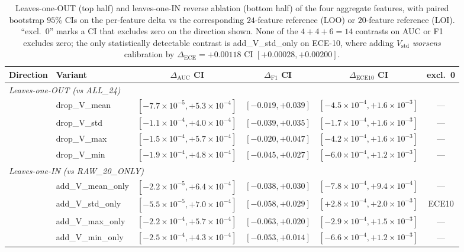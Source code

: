 \documentclass{article}
\begin{document}
\begin{table}[t]
\centering
\small
\caption{Leaves-one-OUT (top half) and leaves-one-IN reverse
ablation (bottom half) of the four aggregate features, with paired
bootstrap $95$\% CIs on the per-feature delta vs the
corresponding $24$-feature reference (LOO) or $20$-feature reference
(LOI). ``excl.\ 0'' marks a CI that excludes zero on the direction
shown. None of the $4{+}4{+}6{=}14$ contrasts on AUC or F1
excludes zero; the only statistically detectable contrast is
\textsf{add\_V\_std\_only} on ECE-10, where adding $V_{\text{std}}$
\emph{worsens} calibration by $\Delta_{\text{ECE}}{=}{+}0.00118$
CI $[{+}0.00028, {+}0.00200]$.}
\label{tab:p8-perfeat-abl}
\begin{tabular}{llcccc}
\toprule
Direction & Variant & $\Delta_{\text{AUC}}$ CI & $\Delta_{\text{F1}}$ CI & $\Delta_{\text{ECE10}}$ CI & excl.\ 0 \\
\midrule
\multicolumn{6}{l}{\emph{Leaves-one-OUT (vs ALL\_24)}} \\
& drop\_V\_mean & $[-7.7\!\times\!10^{-5}, +5.3\!\times\!10^{-4}]$ & $[-0.019, +0.039]$ & $[-4.5\!\times\!10^{-4}, +1.6\!\times\!10^{-3}]$ & --- \\
& drop\_V\_std  & $[-1.1\!\times\!10^{-4}, +4.0\!\times\!10^{-4}]$ & $[-0.039, +0.035]$ & $[-1.7\!\times\!10^{-4}, +1.6\!\times\!10^{-3}]$ & --- \\
& drop\_V\_max  & $[-1.5\!\times\!10^{-4}, +5.7\!\times\!10^{-4}]$ & $[-0.020, +0.047]$ & $[-4.2\!\times\!10^{-4}, +1.6\!\times\!10^{-3}]$ & --- \\
& drop\_V\_min  & $[-1.9\!\times\!10^{-4}, +4.8\!\times\!10^{-4}]$ & $[-0.045, +0.027]$ & $[-6.0\!\times\!10^{-4}, +1.2\!\times\!10^{-3}]$ & --- \\
\midrule
\multicolumn{6}{l}{\emph{Leaves-one-IN (vs RAW\_20\_ONLY)}} \\
& add\_V\_mean\_only & $[-2.2\!\times\!10^{-5}, +6.4\!\times\!10^{-4}]$ & $[-0.038, +0.030]$ & $[-7.8\!\times\!10^{-4}, +9.4\!\times\!10^{-4}]$ & --- \\
& add\_V\_std\_only  & $[-5.5\!\times\!10^{-5}, +7.0\!\times\!10^{-4}]$ & $[-0.058, +0.029]$ & $[+2.8\!\times\!10^{-4}, +2.0\!\times\!10^{-3}]$ & ECE10 \\
& add\_V\_max\_only  & $[-2.2\!\times\!10^{-4}, +5.7\!\times\!10^{-4}]$ & $[-0.063, +0.020]$ & $[-2.9\!\times\!10^{-4}, +1.5\!\times\!10^{-3}]$ & --- \\
& add\_V\_min\_only  & $[-2.5\!\times\!10^{-4}, +4.3\!\times\!10^{-4}]$ & $[-0.053, +0.014]$ & $[-6.6\!\times\!10^{-4}, +1.2\!\times\!10^{-3}]$ & --- \\

\end{tabular}
\end{table}
\end{document}
